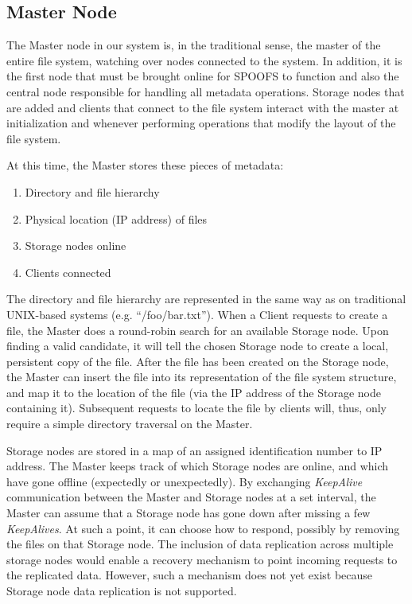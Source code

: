 
\subsection{Master Node}

The Master node in our system is, in the traditional sense, the master of the entire file system, watching over nodes connected to the system. In addition, it is the first node that must be brought online for SPOOFS to function and also the central node responsible for handling all metadata operations. Storage nodes that are added and clients that connect to the file system interact with the master at initialization and whenever performing operations that modify the layout of the file system.

At this time, the Master stores these pieces of metadata:
\begin{enumerate}
\item Directory and file hierarchy
\item Physical location (IP address) of files
\item Storage nodes online
\item Clients connected
\end{enumerate}
The directory and file hierarchy are represented in the same way as on traditional UNIX-based systems (e.g. ``/foo/bar.txt''). When a Client requests to create a file, the Master does a round-robin search for an available Storage node. Upon finding a valid candidate, it will tell the chosen Storage node to create a local, persistent copy of the file.  After the file has been created on the Storage node, the Master can insert the file into its representation of the file system structure, and map it to the location of the file (via the IP address of the Storage node containing it). Subsequent requests to locate the file by clients will, thus, only require a simple directory traversal on the Master.

Storage nodes are stored in a map of an assigned identification number to IP address. The Master keeps track of which Storage nodes are online, and which have gone offline (expectedly or unexpectedly). By exchanging \textit{KeepAlive} communication between the Master and Storage nodes at a set interval, the Master can assume that a Storage node has gone down after missing a few \textit{KeepAlives}. At such a point, it can choose how to respond, possibly by removing the files on that Storage node. The inclusion of data replication across multiple storage nodes would enable a recovery mechanism to point incoming requests to the replicated data.  However, such a mechanism does not yet exist because Storage node data replication is not supported.


